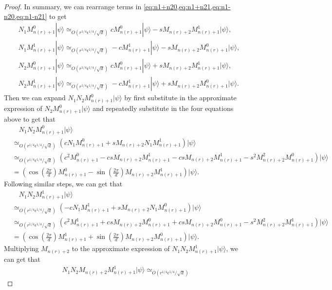 \documentclass[11pt,letterpaper]{article}
\newcommand{\ket}[1]{|#1\rangle}
\newcommand{\1}{\mathbb{1}}
\newcommand{\nr}{n(r)}
\newcommand{\qe}{\epsilon^{1/4}}
\newcommand{\sd}{\sqrt{d}}
\newcommand{\qr}{r^{1/4}}
\newcommand{\appd}[1]{\simeq_{#1}}
\theoremstyle{definition}
\begin{document}
\begin{proof}
	In summary, we can rearrange terms in \cref{eq:n1+n20,eq:n1+n21,eq:n1-n20,eq:n1-n21} to get
        \begin{align*}
        		&N_1M_{\nr+1}^0 \ket{\psi} \appd{O(\qr \qe/ \sd)} cM_{\nr+1}^0\ket{\psi} - sM_{\nr+2}M_{\nr+1}^1\ket{\psi},\\
        		&N_1M_{\nr+1}^1 \ket{\psi} \appd{O(\qr \qe/ \sd)} -cM_{\nr+1}^1\ket{\psi} - sM_{\nr+2}M_{\nr+1}^0\ket{\psi},\\
        		&N_2M_{\nr+1}^0 \ket{\psi} \appd{O( \qr \qe /\sd)} cM_{\nr+1}^0\ket{\psi} + sM_{\nr+2}M_{\nr+1}^1\ket{\psi},\\
        		&N_2M_{\nr+1}^1 \ket{\psi} \appd{O(\qr \qe/ \sd )} -cM_{\nr+1}^1\ket{\psi} + sM_{\nr+2}M_{\nr+1}^0\ket{\psi}.
        \end{align*}
        Then we can expand $N_1N_2 M_{\nr+1}^0\ket{\psi}$ by first substitute in
        the approximate expression of $N_2 M_{\nr+1}^0\ket{\psi}$ and repeatedly
        substitute in the four equations above
        to get that
        \begin{align*}
        		&\quad N_1N_2 M_{\nr+1}^0 \ket{\psi} \\
		        &\appd{O(\qr \qe/\sd)} (c N_1M_{\nr+1}^0 +sM_{\nr+2}N_1M_{\nr+1}^1)\ket{\psi}\\
        		&\appd{O( \qr \qe/\sd)}(c^2M_{\nr+1}^0- csM_{\nr+2}M_{\nr+1}^1 -csM_{\nr+2}M_{\nr+1}^1 -s^2 M_{\nr+2}^2 M_{\nr+1}^0)\ket{\psi}\\
        		&= (\cos(\frac{2\pi}{d}) M_{\nr+1}^0 - \sin(\frac{2\pi}{d}) M_{\nr+2}M_{\nr+1}^1)\ket{\psi}.
        \end{align*}
        Following similar steps, we can get that
        \begin{align*}
            &\quad N_1N_2 M_{\nr+1}^1 \ket{\psi} \\
		    &\appd{O( \qr \qe/\sd)} (-c N_1M_{\nr+1}^1 +sM_{\nr+2}N_1M_{\nr+1}^0)\ket{\psi}\\
        		&\appd{O(\qr \qe/\sd)}(c^2M_{\nr+1}^1+ csM_{\nr+2}M_{\nr+1}^0 +csM_{\nr+2}M_{\nr+1}^0 -s^2 M_{\nr+2}^2 M_{\nr+1}^1)\ket{\psi}\\
        		&= (\cos(\frac{2\pi}{d}) M_{\nr+1}^1 + \sin(\frac{2\pi}{d}) M_{\nr+2}M_{\nr+1}^0)\ket{\psi}.
        \end{align*}
        Multiplying $M_{\nr+2}$ to 
        the approximate expression of $N_1N_2 M_{\nr+1}^1 \ket{\psi}$,
        we can get that
        \begin{align*}
        N_1N_2 M_{\nr+2}M_{\nr+1}^1 \ket{\psi}\appd{O(\qr \qe/\sd)} 

\end{align*}
\end{proof}
\end{document}
